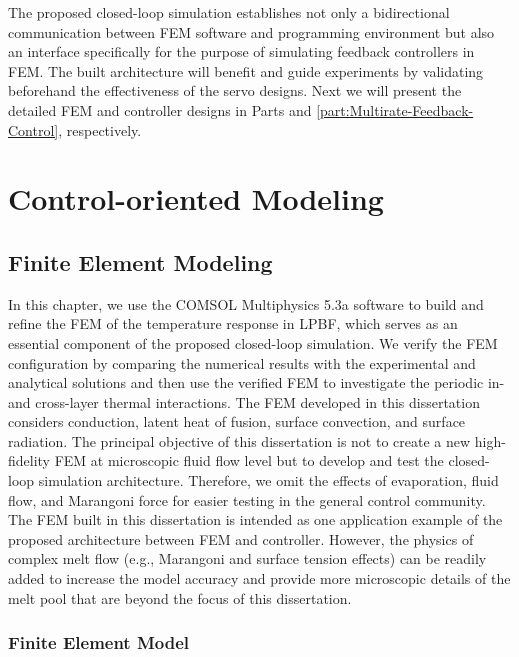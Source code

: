 \documentclass [11pt, proquest] {uwthesis}[2020/02/24]
\begin{document}
The proposed closed-loop simulation establishes not only a bidirectional
communication between FEM software and programming environment but
also an interface specifically for the purpose of simulating feedback
controllers in FEM. The built architecture will benefit and guide
experiments by validating beforehand the effectiveness of the servo
designs. Next we will present the detailed FEM and controller designs
in Parts \ref{part:Control-oriented Modeling} and \ref{part:Multirate-Feedback-Control},
respectively.


\part{Control-oriented Modeling} \label{part:Control-oriented Modeling}


\chapter{Finite Element Modeling} \label{chap:FEM}

In this chapter, we use the COMSOL Multiphysics 5.3a software to build
and refine the FEM of the temperature response in LPBF, which serves
as an essential component of the proposed closed-loop simulation.
We verify the FEM configuration by comparing the numerical results
with the experimental and analytical solutions and then use the verified FEM to investigate
the periodic in- and cross-layer thermal interactions. The FEM developed
in this dissertation considers conduction, latent heat of fusion, surface
convection, and surface radiation. The principal objective of this dissertation is not to create a new high-fidelity FEM at microscopic fluid
flow level but to develop and test the closed-loop simulation architecture.
Therefore, we omit the effects of evaporation, fluid flow, and Marangoni
force for easier testing in the general control community. The FEM
built in this dissertation is intended as one application example of the
proposed architecture between FEM and controller. However, the physics
of complex melt flow (e.g., Marangoni and surface tension effects)
can be readily added to increase the model accuracy and provide more
microscopic details of the melt pool that are beyond the focus of
this dissertation.

\section{Finite Element Model} \label{sec:FEM}
\end{document}

